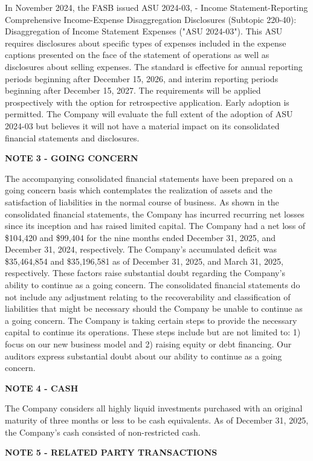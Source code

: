 \documentclass[11pt,a4paper]{article}
\begin{document}
In November 2024, the FASB issued ASU 2024-03, - Income Statement-Reporting Comprehensive Income-Expense Disaggregation Disclosures (Subtopic 220-40): Disaggregation of Income Statement Expenses ("ASU 2024-03"). This ASU requires disclosures about specific types of expenses included in the expense captions presented on the face of the statement of operations as well as disclosures about selling expenses. The standard is effective for annual reporting periods beginning after December 15, 2026, and interim reporting periods beginning after December 15, 2027. The requirements will be applied prospectively with the option for retrospective application. Early adoption is permitted. The Company will evaluate the full extent of the adoption of ASU 2024-03 but believes it will not have a material impact on its consolidated financial statements and disclosures.

\textbf{NOTE 3 - GOING CONCERN}

The accompanying consolidated financial statements have been prepared on a going concern basis which contemplates the realization of assets and the satisfaction of liabilities in the normal course of business. As shown in the consolidated financial statements, the Company has incurred recurring net losses since its inception and has raised limited capital. The Company had a net loss of \$104,420 and \$99,404 for the nine months ended December 31, 2025, and December 31, 2024, respectively. The Company's accumulated deficit was \$35,464,854 and \$35,196,581 as of December 31, 2025, and March 31, 2025, respectively. These factors raise substantial doubt regarding the Company's ability to continue as a going concern. The consolidated financial statements do not include any adjustment relating to the recoverability and classification of liabilities that might be necessary should the Company be unable to continue as a going concern. The Company is taking certain steps to provide the necessary capital to continue its operations. These steps include but are not limited to: 1) focus on our new business model and 2) raising equity or debt financing. Our auditors express substantial doubt about our ability to continue as a going concern.

\textbf{NOTE 4 - CASH}

The Company considers all highly liquid investments purchased with an original maturity of three months or less to be cash equivalents. As of December 31, 2025, the Company's cash consisted of non-restricted cash.

\textbf{NOTE 5 - RELATED PARTY TRANSACTIONS}
\end{document}
